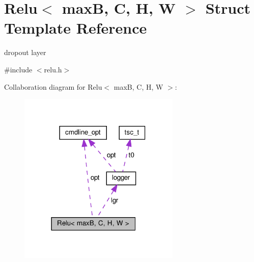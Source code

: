 \hypertarget{structRelu}{}\section{Relu$<$ maxB, C, H, W $>$ Struct Template Reference}
\label{structRelu}


dropout layer  




{\ttfamily \#include $<$relu.\+h$>$}



Collaboration diagram for Relu$<$ maxB, C, H, W $>$\+:\nopagebreak
\begin{figure}[H]
\begin{center}
\leavevmode
\includegraphics[width=218pt]{structRelu__coll__graph}
\end{center}
\end{figure}
